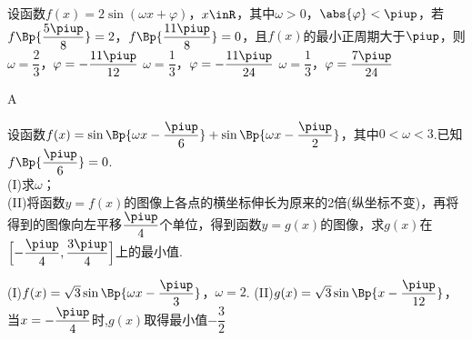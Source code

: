 \begin{exercise}
\begin{answer}
      \end{answer}
    \vspace{1.5em}
    \item%
          设函数$f(x)=2\sin(\omega x+\varphi)$，$x\inR$，其中$\omega>0$，$\abs{\varphi}<\piup$，若$f\Bp{\dfrac{5\piup}8}=2$，$f\Bp{\dfrac{11\piup}8}=0$，且$f(x)$的最小正周期大于$\piup$，则\xz
           {$\omega=\dfrac23$，$\varphi=-\dfrac{11\piup}{12}$}
           {$\omega=\dfrac13$，$\varphi=-\dfrac{11\piup}{24}$}
           {$\omega=\dfrac13$，$\varphi=\dfrac{7\piup}{24}$}
          \begin{answer}
            A
          \end{answer}
    \vspace{1.5em}
    \item%
          设函数$f(x)=\sin\Bp{\omega x-\dfrac{\piup}6}+\sin\Bp{\omega x-\dfrac{\piup}2}$，其中$0<\omega<3$.已知$f\Bp{\dfrac{\piup}6}=0$.\\
          (I)求$\omega$；\\
          (II)将函数$y=f(x)$的图像上各点的横坐标伸长为原来的2倍(纵坐标不变)，再将得到的图像向左平移$\dfrac{\piup}4$个单位，得到函数$y=g(x)$的图像，求$g(x)$在$\Bigl[-\dfrac{\piup}4,\dfrac{3\piup}4\Bigr]$上的最小值.
          \begin{answer}
            (I)$f(x)=\sqrt3\sin\Bp{\omega x-\dfrac{\piup}3}$，$\omega=2$.
            (II)$g(x)=\sqrt3\sin\Bp{x-\dfrac{\piup}{12}}$，当$x=-\dfrac{\piup}4$时,$g(x)$取得最小值$-\dfrac32$
          \end{answer}
    \vspace{5cm}
  \end{exercise}


\newpage
